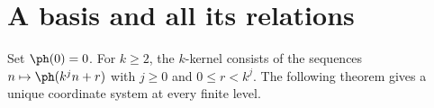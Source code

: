 \section{A basis and all its relations}\label{sec:results}
Set $\ph(0)=0$. For $k\ge2$, the $k$-kernel consists of the sequences
$n\mapsto\ph(k^jn+r)$ with $j\ge0$ and $0\le r<k^j$.
The following theorem gives a unique coordinate system at every finite level.
